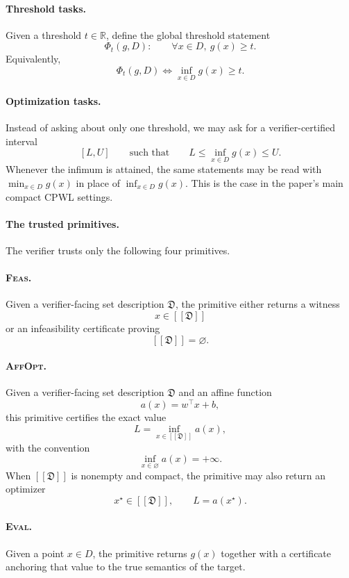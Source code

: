 \paragraph{Threshold tasks.}
Given a threshold $t\in\mathbb R$, define the global threshold statement
\[
\Phi_t(g,D):\qquad \forall x\in D,\ g(x)\ge t.
\]
Equivalently,
\[
\Phi_t(g,D)
\iff
\inf_{x\in D} g(x)\ge t.
\]

\paragraph{Optimization tasks.}
Instead of asking about only one threshold, we may ask for a verifier-certified interval
\[
[L,U]
\qquad\text{such that}\qquad
L\le \inf_{x\in D} g(x)\le U.
\]
Whenever the infimum is attained, the same statements may be read with $\min_{x\in D}g(x)$ in place of $\inf_{x\in D}g(x)$. This is the case in the paper's main compact CPWL settings.

\paragraph{The trusted primitives.}
The verifier trusts only the following four primitives.

\paragraph{\normalfont\textsc{Feas}.}
Given a verifier-facing set description $\mathfrak D$, the primitive either returns a witness
\[
x\in [\![\mathfrak D]\!]
\]
or an infeasibility certificate proving
\[
[\![\mathfrak D]\!]=\varnothing.
\]

\paragraph{\normalfont\textsc{AffOpt}.}
Given a verifier-facing set description $\mathfrak D$ and an affine function
\[
a(x)=w^\top x+b,
\]
this primitive certifies the exact value
\[
L=\inf_{x\in [\![\mathfrak D]\!]} a(x),
\]
with the convention
\[
\inf_{x\in\varnothing} a(x)=+\infty.
\]
When $[\![\mathfrak D]\!]$ is nonempty and compact, the primitive may also return an optimizer
\[
x^\star\in [\![\mathfrak D]\!],
\qquad
L=a(x^\star).
\]

\paragraph{\normalfont\textsc{Eval}.}
Given a point $x\in D$, the primitive returns $g(x)$ together with a certificate anchoring that value to the true semantics of the target.

